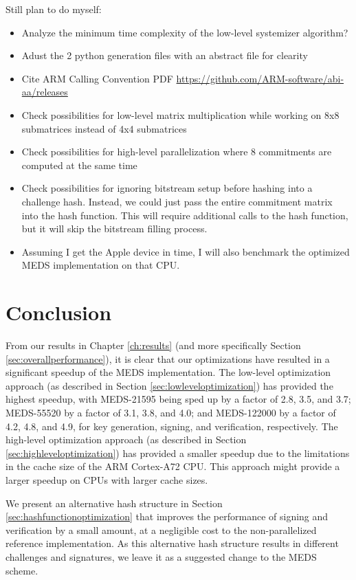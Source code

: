 \documentclass[11pt,a4paper]{report}
\theoremstyle{definition}
\begin{document}
Still plan to do myself:
\begin{itemize}
  \item Analyze the minimum time complexity of the low-level systemizer algorithm?
  \item Adust the 2 python generation files with an abstract file for clearity
  \item Cite ARM Calling Convention PDF \url{https://github.com/ARM-software/abi-aa/releases}
  \item Check possibilities for low-level matrix multiplication while working on 8x8 submatrices instead of 4x4 submatrices
  \item Check possibilities for high-level parallelization where 8 commitments are computed at the same time
  \item Check possibilities for ignoring bitstream setup before hashing into a challenge hash. Instead, we could just pass the entire commitment matrix into the hash function. This will require additional calls to the hash function, but it will skip the bitstream filling process.
  \item Assuming I get the Apple device in time, I will also benchmark the optimized MEDS implementation on that CPU.
\end{itemize}

\chapter{Conclusion}
\label{ch:conclusion}
From our results in Chapter \ref{ch:results} (and more specifically Section \ref{sec:overallperformance}), it is clear that our optimizations have resulted in a significant speedup of the MEDS implementation. The low-level optimization approach (as described in Section \ref{sec:lowleveloptimization}) has provided the highest speedup, with MEDS-21595 being sped up by a factor of 2.8, 3.5, and 3.7; MEDS-55520 by a factor of 3.1, 3.8, and 4.0; and MEDS-122000 by a factor of 4.2, 4.8, and 4.9, for key generation, signing, and verification, respectively. The high-level optimization approach (as described in Section \ref{sec:highleveloptimization}) has provided a smaller speedup due to the limitations in the cache size of the ARM Cortex-A72 CPU. This approach might provide a larger speedup on CPUs with larger cache sizes.

We present an alternative hash structure in Section \ref{sec:hashfunctionoptimization} that improves the performance of signing and verification by a small amount, at a negligible cost to the non-parallelized reference implementation. As this alternative hash structure results in different challenges and signatures, we leave it as a suggested change to the MEDS scheme.
\end{document}
